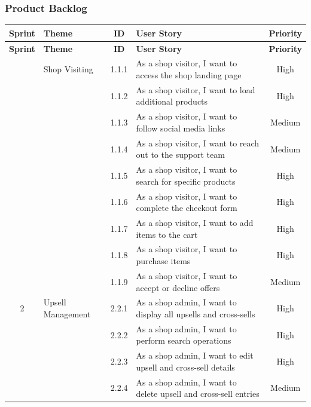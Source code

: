 \subsubsection{Product Backlog}

\begin{longtable}{|c|p{4cm}|c|p{6cm}|c|}
\hline
\textbf{Sprint} & \textbf{Theme} & \textbf{ID} & \textbf{User Story} & \textbf{Priority} \\ 
\hline
\endfirsthead

\hline
\textbf{Sprint} & \textbf{Theme} & \textbf{ID} & \textbf{User Story} & \textbf{Priority} \\ 
\hline
\endhead

\hline
\endfoot

\hline
\endlastfoot

\multirow{1}{*}{1} & \multirow{1}{*}{Shop Visiting} & 1.1.1 & As a shop visitor, I want to access the shop landing page & High \\ \cline{3-5}
& & 1.1.2 & As a shop visitor, I want to load additional products & High \\ \cline{3-5}
& & 1.1.3 & As a shop visitor, I want to follow social media links & Medium \\ \cline{3-5}
& & 1.1.4 & As a shop visitor, I want to reach out to the support team & Medium \\ \cline{3-5}
& & 1.1.5 & As a shop visitor, I want to search for specific products & High \\ \cline{3-5}
& & 1.1.6 & As a shop visitor, I want to complete the checkout form & High \\ \cline{3-5}
& & 1.1.7 & As a shop visitor, I want to add items to the cart & High \\ \cline{3-5}
& & 1.1.8 & As a shop visitor, I want to purchase items & High \\ \cline{3-5}
& & 1.1.9 & As a shop visitor, I want to accept or decline offers & Medium \\ \hline
\multirow{1}{*}{2} & \multirow{1}{*}{Upsell Management} & 2.2.1 & As a shop admin, I want to display all upsells and cross-sells & High \\ \cline{3-5}
& & 2.2.2 & As a shop admin, I want to perform search operations & High \\ \cline{3-5}
& & 2.2.3 & As a shop admin, I want to edit upsell and cross-sell details & High \\ \cline{3-5}
& & 2.2.4 & As a shop admin, I want to delete upsell and cross-sell entries & Medium \\ \cline{3-5}

\end{longtable}
